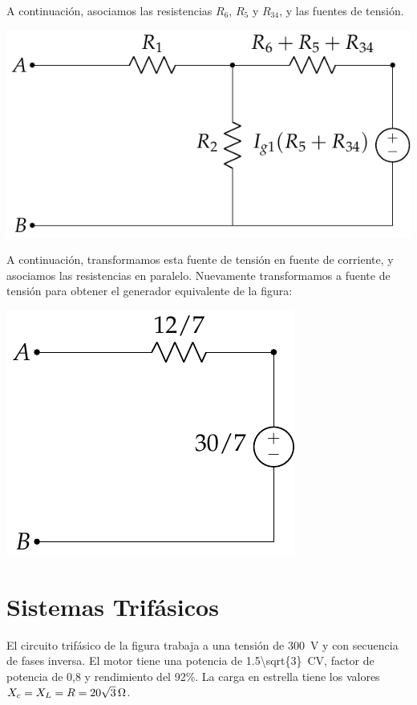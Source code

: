 \documentclass[12pt]{article}
\begin{document}
A continuación, asociamos las resistencias $R_6$, $R_5$ y $R_{34}$, y las fuentes de tensión.

\begin{center}
\includegraphics[height = 0.2\textheight]{figs/movilidad3.pdf}
\end{center}
A continuación, transformamos esta fuente de tensión en fuente de corriente, y asociamos las resistencias en paralelo. Nuevamente transformamos a fuente de tensión para obtener el generador equivalente de la figura:

\begin{center}
\includegraphics[height = 0.2\textheight]{figs/generadorEquivalente.pdf}
\end{center}



\clearpage 

\section{Sistemas Trifásicos}

El circuito trifásico de la figura trabaja a una tensión de \SI{300}{\volt} y con secuencia de fases inversa. El motor tiene una potencia de \SI[parse-numbers=false]{1.5\sqrt{3}}{CV}, factor de potencia de 0,8 y rendimiento del 92\%. La carga en estrella tiene los valores $X_c = X_L = R = \SI[parse-numbers = false]{20\sqrt{3}}{\ohm}$.
\end{document}
